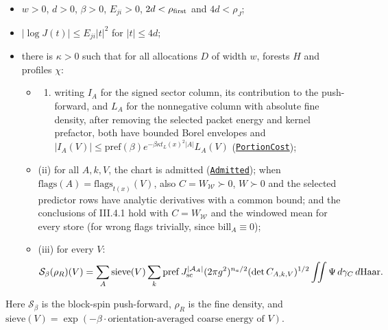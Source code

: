 \documentclass[
  letterpaper,
  11pt]{article}
\providecommand{\tightlist}{%
  \setlength{\itemsep}{0pt}\setlength{\parskip}{0pt}}
\begin{document}
\begin{itemize}
\tightlist
\item
  \(w>0\), \(d>0\), \(\beta>0\), \(E_{ji}>0\), \(2d<\rho_{\rm first}\)
  and \(4d<\rho_J\);
\item
  \(\lvert\log J(t)\rvert\le E_{ji}\lvert t\rvert^2\) for
  \(\lvert t\rvert\le4d\);
\item
  there is \(\kappa>0\) such that for all allocations \(D\) of width
  \(w\), forests \(H\) and profiles \(\chi\):

  \begin{itemize}
  \tightlist
  \item
    \begin{enumerate}
    \def\labelenumi{(\roman{enumi})}
    \tightlist
    \item
      writing \(I_A\) for the signed sector column, its contribution to
      the push-forward, and \(L_A\) for the nonnegative column with
      absolute fine density, after removing the selected packet energy
      and kernel prefactor, both have bounded Borel envelopes and
      \(|I_A(V)|\le\mathrm{pref}(\beta)e^{-\beta\kappa t_L(x)^2|A|}L_A(V)\)
      (\href{https://github.com/yang-mills-group/OpenAI-YM-20261028/blob/3456e5e75cf8d4cd558955a5c7638fba2d68f464/YM/Push/SECTOR_MEASURE/Presented.lean\#L151-L155}{\texttt{PortionCost}});
    \end{enumerate}
  \item
    (ii) for all \(A,k,V\), the chart is admitted
    (\href{https://github.com/yang-mills-group/OpenAI-YM-20261028/blob/3456e5e75cf8d4cd558955a5c7638fba2d68f464/YM/SectorNext/GAUSSIAN_SECTOR_CHANGE/Stamped.lean\#L36-L42}{\texttt{Admitted}});
    when \(\mathrm{flags}(A)=\mathrm{flags}_{t(x)}(V)\), also
    \(C=W_{\mathcal W}\succ0\), \(W\succ0\) and the selected predictor
    rows have analytic derivatives with a common bound; and the
    conclusions of III.4.1 hold with \(C=W_{\mathcal W}\) and the
    windowed mean for every store (for wrong flags trivially, since
    \(\mathrm{bill}_A\equiv0\));
  \item
    (iii) for every \(V\):
    \[\mathcal S_\beta(\rho_R)(V)=\sum_A\mathrm{sieve}(V)\sum_k\mathrm{pref}\,J_{\rm sc}^{\lvert\mathcal A_A\rvert}(2\pi g^2)^{n_a/2}(\det C_{A,k,V})^{1/2}\iint\Psi\,d\gamma_{C}\,d\mathrm{Haar}.\]
  \end{itemize}
\end{itemize}

Here \(\mathcal S_\beta\) is the block-spin push-forward, \(\rho_R\) is
the fine density, and
\(\mathrm{sieve}(V)=\exp(-\beta\cdot\text{orientation-averaged coarse energy of }V)\).
\end{document}

